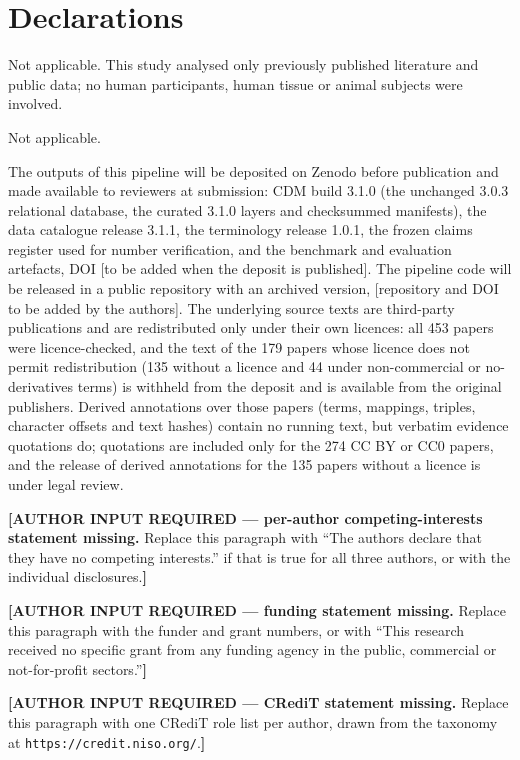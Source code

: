 \documentclass[referee,lineno,pdflatex,sn-vancouver-num]{sn-jnl}
\theoremstyle{thmstyleone}%
\theoremstyle{thmstyletwo}%
\theoremstyle{thmstylethree}%
\begin{document}
\section*{Declarations}

Not applicable. This study analysed only previously published literature and
public data; no human participants, human tissue or animal subjects were
involved.

Not applicable.

The outputs of this pipeline will be deposited on Zenodo before
publication and made available to reviewers at submission: CDM build
3.1.0 (the unchanged 3.0.3 relational database, the curated 3.1.0 layers
and checksummed manifests), the data catalogue release 3.1.1, the
terminology release 1.0.1, the frozen claims register used for number
verification, and the benchmark and evaluation artefacts, DOI [to be
added when the deposit is published]. The pipeline code will be released
in a public repository with an archived version, [repository and DOI to
be added by the authors]. The underlying source texts are third-party
publications and are redistributed only under their own licences: all
453 papers were licence-checked, and the text of the 179 papers whose
licence does not permit redistribution (135 without a licence and 44
under non-commercial or no-derivatives terms) is withheld from the
deposit and is available from the original publishers. Derived annotations
over those papers (terms, mappings, triples, character offsets and text
hashes) contain no running text, but verbatim evidence quotations do; quotations
are included only for the 274 CC BY or CC0 papers, and the release of derived
annotations for the 135 papers without a licence is under legal review.

\textbf{[AUTHOR INPUT REQUIRED --- per-author competing-interests statement
missing.} Replace this paragraph with ``The authors declare that they have
no competing interests.'' if that is true for all three authors, or with the
individual disclosures.\textbf{]}

\textbf{[AUTHOR INPUT REQUIRED --- funding statement missing.} Replace this
paragraph with the funder and grant numbers, or with ``This research received
no specific grant from any funding agency in the public, commercial or
not-for-profit sectors.''\textbf{]}

\textbf{[AUTHOR INPUT REQUIRED --- CRediT statement missing.} Replace this
paragraph with one CRediT role list per author, drawn from the taxonomy at
\nolinkurl{https://credit.niso.org/}.\textbf{]}
\end{document}
